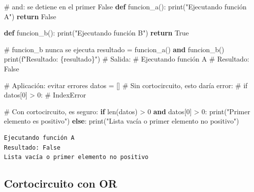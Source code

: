 \documentclass[
  doc,
  floatsintext,
  longtable,
  a4paper,
  nolmodern,
  notxfonts,
  notimes,
  12pt,
  colorlinks=true,linkcolor=blue,citecolor=blue,urlcolor=blue]{apa7}
\newenvironment{Shaded}{\begin{snugshade}}{\end{snugshade}}
\newcommand{\BuiltInTok}[1]{\textcolor[rgb]{0.00,0.23,0.31}{#1}}
\newcommand{\CommentTok}[1]{\textcolor[rgb]{0.37,0.37,0.37}{#1}}
\newcommand{\ControlFlowTok}[1]{\textcolor[rgb]{0.00,0.23,0.31}{\textbf{#1}}}
\newcommand{\DecValTok}[1]{\textcolor[rgb]{0.68,0.00,0.00}{#1}}
\newcommand{\KeywordTok}[1]{\textcolor[rgb]{0.00,0.23,0.31}{\textbf{#1}}}
\newcommand{\NormalTok}[1]{\textcolor[rgb]{0.00,0.23,0.31}{#1}}
\newcommand{\OperatorTok}[1]{\textcolor[rgb]{0.37,0.37,0.37}{#1}}
\newcommand{\SpecialCharTok}[1]{\textcolor[rgb]{0.37,0.37,0.37}{#1}}
\newcommand{\SpecialStringTok}[1]{\textcolor[rgb]{0.13,0.47,0.30}{#1}}
\newcommand{\StringTok}[1]{\textcolor[rgb]{0.13,0.47,0.30}{#1}}
\newcommand{\VariableTok}[1]{\textcolor[rgb]{0.07,0.07,0.07}{#1}}
\begin{document}
\begin{Shaded}
\begin{Highlighting}[]
\CommentTok{\# and: se detiene en el primer False}
\KeywordTok{def}\NormalTok{ funcion\_a():}
    \BuiltInTok{print}\NormalTok{(}\StringTok{"Ejecutando función A"}\NormalTok{)}
    \ControlFlowTok{return} \VariableTok{False}

\KeywordTok{def}\NormalTok{ funcion\_b():}
    \BuiltInTok{print}\NormalTok{(}\StringTok{"Ejecutando función B"}\NormalTok{)}
    \ControlFlowTok{return} \VariableTok{True}

\CommentTok{\# funcion\_b nunca se ejecuta}
\NormalTok{resultado }\OperatorTok{=}\NormalTok{ funcion\_a() }\KeywordTok{and}\NormalTok{ funcion\_b()}
\BuiltInTok{print}\NormalTok{(}\SpecialStringTok{f"Resultado: }\SpecialCharTok{\{}\NormalTok{resultado}\SpecialCharTok{\}}\SpecialStringTok{"}\NormalTok{)}
\CommentTok{\# Salida:}
\CommentTok{\# Ejecutando función A}
\CommentTok{\# Resultado: False}

\CommentTok{\# Aplicación: evitar errores}
\NormalTok{datos }\OperatorTok{=}\NormalTok{ []}
\CommentTok{\# Sin cortocircuito, esto daría error:}
\CommentTok{\# if datos[0] \textgreater{} 0:  \# IndexError}

\CommentTok{\# Con cortocircuito, es seguro:}
\ControlFlowTok{if} \BuiltInTok{len}\NormalTok{(datos) }\OperatorTok{\textgreater{}} \DecValTok{0} \KeywordTok{and}\NormalTok{ datos[}\DecValTok{0}\NormalTok{] }\OperatorTok{\textgreater{}} \DecValTok{0}\NormalTok{:}
    \BuiltInTok{print}\NormalTok{(}\StringTok{"Primer elemento es positivo"}\NormalTok{)}
\ControlFlowTok{else}\NormalTok{:}
    \BuiltInTok{print}\NormalTok{(}\StringTok{"Lista vacía o primer elemento no positivo"}\NormalTok{)}
\end{Highlighting}
\end{Shaded}

\begin{verbatim}
Ejecutando función A
Resultado: False
Lista vacía o primer elemento no positivo
\end{verbatim}

\subsection{Cortocircuito con OR}\label{cortocircuito-con-or}
\end{document}
